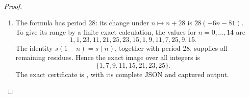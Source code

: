 \begin{proof}
\begin{enumerate}[label=\arabic*.]
\item The formula has period 28: its change under \(n\mapsto n+28\) is
\(28(-6n-81)\). To give its range by a finite exact calculation,
the values for \(n=0,\ldots,14\) are
\[
 1,1,23,11,21,25,23,15,1,9,11,7,25,9,15.
\]
The identity \(s(1-n)=s(n)\), together with period 28, supplies
all remaining residues. Hence the exact image over all integers is
\[
                  \{1,7,9,11,15,21,23,25\}.
\]
The exact certificate is ,
with its complete JSON and captured output.

\end{enumerate}
\end{proof}